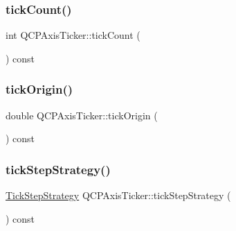 \subsubsection{\texorpdfstring{tickCount()}{tickCount()}}
{\footnotesize\ttfamily int Q\+C\+P\+Axis\+Ticker\+::tick\+Count (\begin{DoxyParamCaption}{ }\end{DoxyParamCaption}) const\hspace{0.3cm}{\ttfamily [inline]}}

\mbox{\label{class_q_c_p_axis_ticker_ac0c6e9587c36fdeefb5518c00fe7ab15}} 
\subsubsection{\texorpdfstring{tickOrigin()}{tickOrigin()}}
{\footnotesize\ttfamily double Q\+C\+P\+Axis\+Ticker\+::tick\+Origin (\begin{DoxyParamCaption}{ }\end{DoxyParamCaption}) const\hspace{0.3cm}{\ttfamily [inline]}}

\mbox{\label{class_q_c_p_axis_ticker_a58df76f2ec3eb48401bdd314b0e14ba1}} 
\subsubsection{\texorpdfstring{tickStepStrategy()}{tickStepStrategy()}}
{\footnotesize\ttfamily \mbox{\hyperlink{class_q_c_p_axis_ticker_ab6d2f9d9477821623ac9bc4b21ddf49a}{Tick\+Step\+Strategy}} Q\+C\+P\+Axis\+Ticker\+::tick\+Step\+Strategy (\begin{DoxyParamCaption}{ }\end{DoxyParamCaption}) const\hspace{0.3cm}{\ttfamily [inline]}}

\mbox{\label{class_q_c_p_axis_ticker_ab28cc1ab549489be7975f5ce7e717916}} 
